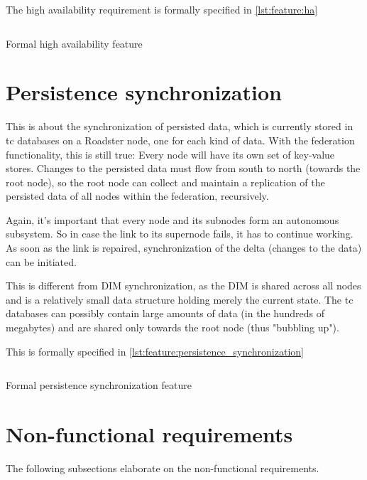 The high availability requirement is formally specified in \autoref{lst:feature:ha}

\begin{listing}
	\inputminted{Gherkin}{listings/features/high_availability.feature}
	\caption{Formal high availability feature}
	\label{lst:feature:ha}
\end{listing}

\section{Persistence synchronization}
This is about the synchronization of persisted data, which is currently stored
in \gls{tc} databases on a Roadster node, one for each kind of data. With the federation functionality, this is
still true: Every node will have its own set of key-value stores. Changes to the persisted
data must flow from south to north (towards the root node), so the root
node can collect and maintain a replication of the persisted data of all
nodes within the federation, recursively.

Again, it's important that every node and its subnodes form an autonomous subsystem. So
in case the link to its supernode fails, it has to continue working. As soon as
the link is repaired, synchronization of the delta (changes to the data) can
be initiated.

This is different from \gls{DIM} synchronization, as the DIM is shared across
all nodes and is a relatively small data structure holding merely the current state. The \gls{tc} databases
can possibly contain large amounts of data (in the hundreds of megabytes) and
are shared only towards the root node (thus "bubbling up").

This is formally specified in \autoref{lst:feature:persistence_synchronization}

\begin{listing}
	\inputminted{Gherkin}{listings/features/persistence_synchronization.feature}
	\caption{Formal persistence synchronization feature}
	\label{lst:feature:persistence_synchronization}
\end{listing}

\section{Non-functional requirements}\label{sec:nfr}
The following subsections elaborate on the non-functional requirements.

